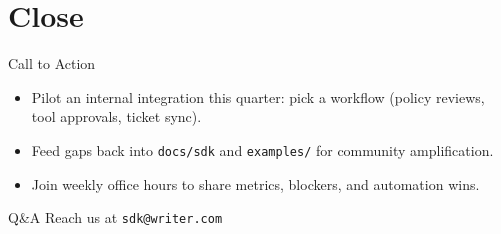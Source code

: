\documentclass[aspectratio=169]{beamer}
\begin{document}
\section{Close}

\begin{frame}{Call to Action}
  \begin{itemize}
    \item Pilot an internal integration this quarter: pick a workflow (policy reviews, tool approvals, ticket sync).
    \item Feed gaps back into \texttt{docs/sdk} and \texttt{examples/} for community amplification.
    \item Join weekly office hours to share metrics, blockers, and automation wins.
  \end{itemize}
\end{frame}

\begin{frame}{Q\&A}
  \centering
  Reach us at \texttt{sdk@writer.com}
\end{frame}
\end{document}
